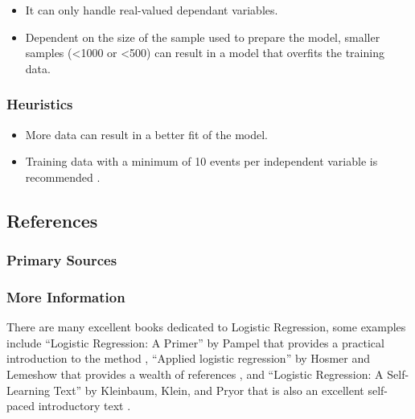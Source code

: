 \begin{itemize}
	\item It can only handle real-valued dependant variables.
	\item Dependent on the size of the sample used to prepare the model, smaller samples (<1000 or <500) can result in a model that overfits the training data.
\end{itemize}

\subsubsection{Heuristics}

\begin{itemize}
	\item More data can result in a better fit of the model.
	\item Training data with a minimum of 10 events per independent variable is recommended \cite{Peduzzi1996}.
\end{itemize}


\subsection{References}

\subsubsection{Primary Sources}



\subsubsection{More Information}

There are many excellent books dedicated to Logistic Regression, some examples include 
``Logistic Regression: A Primer'' by Pampel that provides a practical introduction to the method \cite{Pampel2000}, ``Applied logistic regression'' by Hosmer and Lemeshow that provides a wealth of references \cite{Hosmer2000}, and ``Logistic Regression: A Self-Learning Text'' by Kleinbaum, Klein, and Pryor that is also an excellent self-paced introductory text \cite{Kleinbaum2010}.


